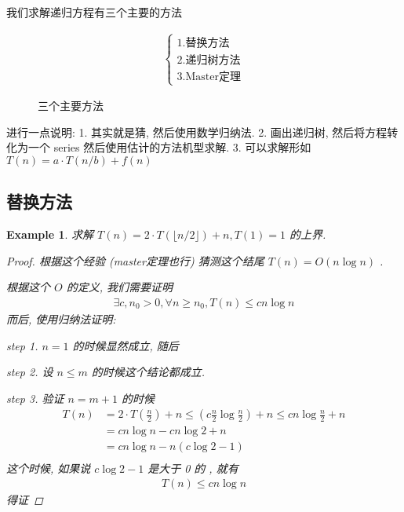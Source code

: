 \documentclass[a4paper, 10pt]{ctexart} %
\newtheorem{example}{Example}
\begin{document}
我们求解递归方程有三个主要的方法
\begin{figure}[H]
    \centering
    \begin{align*}
        \begin{cases}
            1. \text{替换方法} \\
            2. \text{递归树方法} \\
            3. \text{Master定理} 
        \end{cases}
    \end{align*}
    \caption{三个主要方法}
\end{figure}
进行一点说明: 1. 其实就是猜, 然后使用数学归纳法. 2. 画出递归树, 然后将方程转化为一个 series 然后使用估计的方法机型求解. 
3. 可以求解形如 $T \left(n\right) =  a \cdot   T \left( n /  b\right) + f\left(n\right)$

\subsection{替换方法}
\begin{example}
    求解 $ T \left(n\right) =  2 \cdot  T \left(\lfloor n / 2 \rfloor \right) + n , T \left(1\right)   =1$  的上界. 
    \begin{proof}
        根据这个经验 (master定理也行) 猜测这个结尾 $T \left(n\right) = O\left( n \log n \right)$ .
        
        根据这个 $O$ 的定义, 我们需要证明 
        \begin{align*}
            \exists c ,  n _{0} > 0 , \forall  n \ge n_{0} , T \left(n \right)  \le c n \log n
        \end{align*}
        而后, 使用归纳法证明: 

        step 1.  $n = 1$ 的时候显然成立, 随后 

        step 2. 设 $n  \le m   $ 的时候这个结论都成立. 

        step 3. 验证 $n  = m+ 1$ 的时候
        \begin{align*}
            T \left(n\right) & =  2 \cdot  T \left( \frac{n}{2} \right) + n \le  \left( c \frac{n}{2}  \log  \frac{n}{2} \right) + n \le c n \log \frac{n}{2} + n\\
            & = c n \log  n - cn \log  2  + n\\
            & = cn \log  n - n (c \log  2 - 1) \\
        \end{align*}
        这个时候, 如果说 $ c \log  2 - 1$ 是大于 0 的 , 就有 
        \begin{align*}
            T \left(n\right) \le c n \log n
        \end{align*}
        得证
    \end{proof}
\end{example}
\end{document}
